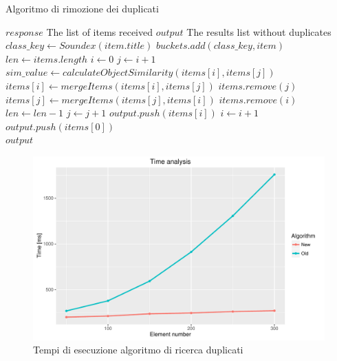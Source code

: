 \begin{algorithm}
	\caption{Algoritmo di rimozione dei duplicati}
	\label{alg:algoritmo-rimozione-duplicati}
	\begin{algorithmic}
		\Require
		\Statex $ response $ \Comment The list of items received
		\Ensure
		\Statex $ output $ \Comment The results list without duplicates
		\Statex
		\State $ class\_key \gets Soundex(item.title) $
		\State $ buckets.add(class\_key, item) $
		\EndFor
		\State $ len \gets items.length $
		\State $ i \gets 0 $
		\State $ j \gets i + 1 $
		\State $ sim\_value \gets calculateObjectSimilarity(items[i], items[j])$
		\State $ items[i] \gets mergeItems(items[i], items[j]) $
		\State $ items.remove(j) $
		\Else
		\State $ items[j] \gets mergeItems(items[j], items[i]) $
		\State $ items.remove(i) $
		\EndIf
		\State $ len \gets len - 1 $
		\Else
		\State $ j \gets j + 1 $
		\EndIf
		\EndWhile
		\State $ output.push(items[i]) $
		\State $ i \gets i + 1 $
		\EndWhile
		\Else
		\State $ output.push(items[0]) $
		\EndIf
		\EndFor\\
		\Return $ output $
	\end{algorithmic}
\end{algorithm}

\begin{figure}[!b]
	\centering
	\includegraphics[width=\textwidth]{3-metodologia-camus/Immagini/similarity_time_analysis.pdf}
	\caption{Tempi di esecuzione algoritmo di ricerca duplicati}\label{fig:tempo-esecuzione-algoritmo-duplicati}
\end{figure}

